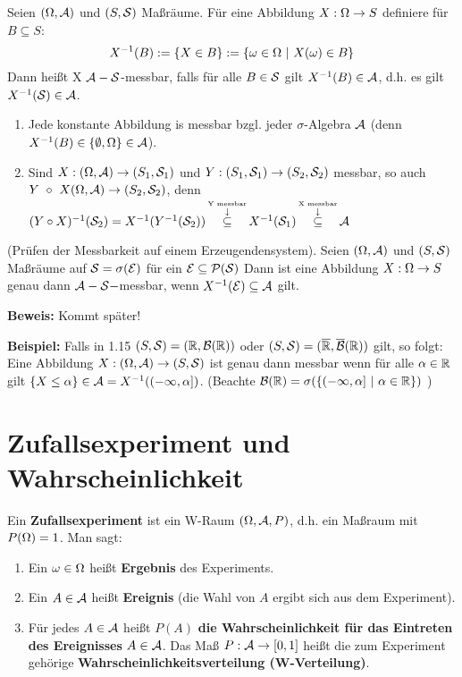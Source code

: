 \documentclass[parskip = full, 12pt]{scrartcl}
\begin{document}
\label{ss: Definiton 1.13}
	Seien $(\Omega, \mathcal{A})$ und $(S,\mathcal{S})$ Maßräume. Für eine Abbildung $X:\Omega 
	\rightarrow S$ definiere für $B \subseteq S $:
	$$ X^{-1}(B) := \{ X \in B \} := \{ \omega \in \Omega\ |\ X(\omega) \in B \} $$
	Dann heißt X $\mathcal{A}-\mathcal{S}$-messbar, falls für alle $B \in \mathcal{S}$ gilt $X^{-1}(B)
	\in \mathcal{A}$, d.h. es gilt \mbox{$X^{-1}(\mathcal{S}) \in \mathcal{A}$.}

\label{ss: Bemerkung 1.14}
	\begin{enumerate}
		\item Jede konstante Abbildung is messbar bzgl. jeder $\sigma$-Algebra $\mathcal{A}$
			(denn $X^{-1}(B) \in \{ \emptyset, \Omega \} \in \mathcal{A}$).
		\item Sind $X:(\Omega, \mathcal{A}) \rightarrow (S_1, \mathcal{S}_1)$ und $Y:(S_1,\mathcal{S}_1)
			\rightarrow (S_2, \mathcal{S}_2)$ messbar, so auch $Y~\circ~X (\Omega, \mathcal{A}) 
			\rightarrow (S_2, \mathcal{S}_2)$, denn $(Y \circ X)^{-1}(\mathcal{S}_2) = X^{-1}(Y^{-1}
			(\mathcal{S}_2)) \mathop{\subseteq} \limits^{\mathop{\downarrow} \limits^{\textrm{Y messbar}}} X^{-1}(\mathcal{S}_1) \mathop{\subseteq} \limits^{\mathop{\downarrow} \limits^{\textrm{X messbar}}} \mathcal{A}$
	\end{enumerate}

\label{ss: Lemma 1.15}
  (Prüfen der Messbarkeit auf einem Erzeugendensystem). Seien $(\Omega, \mathcal{A})$ und 
  $(S,\mathcal{S})$ Maßräume auf $\mathcal{S} = \sigma(\mathcal{E})$ für ein $\mathcal{E} \subseteq \mathcal{P}(\mathcal{S})$ 
  Dann ist eine Abbildung $X:\Omega \rightarrow S$ genau dann $\mathcal{A}-\mathcal{S}-$messbar, 
  wenn $X^{-1}(\mathcal{E}) \subseteq \mathcal{A}$ gilt.

  \textbf{Beweis:} Kommt später!

  \textbf{Beispiel:} Falls in 1.15 $(S,\mathcal{S}) = (\mathbb{R}, \mathcal{B}(\mathbb{R}))$ oder $(S, 
  \mathcal{S}) = (\overline{\mathbb{R}}, \overline{\mathcal{B}}(\mathbb{R}))$ gilt, so folgt: Eine 
   Abbildung $X:(\Omega, \mathcal{A}) \rightarrow (S,\mathcal{S})$ ist genau dann messbar wenn für 
   alle $\alpha \in \mathbb{R}$ gilt $\{ X \leq \alpha \} \in \mathcal{A} = X^{-1}((-\infty, 
   \alpha])$. (Beachte $\mathcal{B} (\mathbb{R}) = \sigma(\{ (-\infty, \alpha]\ |\ \alpha 
   \in \mathbb{R} \})$ )

\section{Zufallsexperiment und Wahrscheinlichkeit}
\label{s: 2.Zufallsexperiment und Wahrscheinlichkeit}

\label{ss: Definiton 2.1}
	Ein \textbf{Zufallsexperiment} ist ein W-Raum $(\Omega, \mathcal{A}, P)$, d.h. ein
	Maßraum mit $P(\Omega) = 1$. Ḿan sagt:
	\begin{enumerate}
	 	\item Ein $\omega \in \Omega$ heißt \textbf{Ergebnis} des Experiments.
	 	\item Ein $A \in \mathcal{A}$ heißt \textbf{Ereignis} (die Wahl von $A$ ergibt
	 		sich aus dem Experiment).
	 	\item Für jedes $A \in \mathcal{A}$ heißt $P(A)$ \textbf{die Wahrscheinlichkeit 
	 		 für das Eintreten des Ereignisses} $A \in \mathcal{A}$. Das Maß $P:\mathcal{A} 
	 		 \rightarrow [0,1]$	heißt die zum Experiment gehörige \textbf{
	 		 Wahrscheinlichkeitsverteilung (W-Verteilung)}. 
	 \end{enumerate} 
\end{document}
